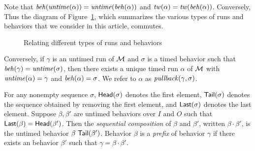 Note that $\mathit{beh}(\mathit{untime}(\alpha))=\mathit{untime}(\mathit{beh}(\alpha))$ and $\mathit{tw}(\alpha) = \mathit{tw}(\mathit{beh}(\alpha))$.
\ifshort
Conversely,
\else
Thus the diagram of Figure~\ref{fig:diagram}, which summarizes the various types of runs and behaviors that we consider
in this article, commutes.
\begin{figure}[h]
\centering
{}
\caption{Relating different types of runs and behaviors}
\label{fig:diagram}
\end{figure}
Conversely,
\fi
if $\gamma$ is an untimed run  of ${\mathcal M}$ and $\sigma$ is a timed behavior such that $\mathit{beh}(\gamma) = \mathit{untime}(\sigma)$,
then there exists a unique timed run $\alpha$ of ${\mathcal M}$ with $\mathit{untime}(\alpha) = \gamma$ and $\mathit{beh}(\alpha) = \sigma$.
We refer to $\alpha$ as $\mathit{pullback}(\gamma,\sigma)$.

For any nonempty sequence $\sigma$, $\mathsf{Head}({\sigma})$ denotes the first element, $\mathsf{Tail}({\sigma})$ denotes the sequence obtained by removing the first element, and $\mathsf{Last}({\sigma})$ denotes the last element.
Suppose $\beta, \beta'$ are untimed behaviors over $I$ and $O$ such that $\mathsf{Last}({\beta}) = \mathsf{Head}({\beta'})$.
Then the \emph{sequential composition} of $\beta$ and $\beta'$, written $\beta \cdot \beta'$, is the untimed behavior $\beta ~ \mathsf{Tail}({\beta'})$.
Behavior $\beta$ is a \emph{prefix} of behavior $\gamma$ if there exists an behavior $\beta'$ such that $\gamma = \beta \cdot \beta'$.

